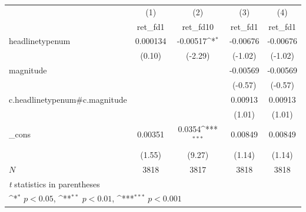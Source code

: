 {
\def\sym#1{\ifmmode^{#1}\else\(^{#1}\)\fi}
\begin{tabular}{l*{4}{c}}
\hline\hline
            &\multicolumn{1}{c}{(1)}&\multicolumn{1}{c}{(2)}&\multicolumn{1}{c}{(3)}&\multicolumn{1}{c}{(4)}\\
            &\multicolumn{1}{c}{ret\_fd1}&\multicolumn{1}{c}{ret\_fd10}&\multicolumn{1}{c}{ret\_fd1}&\multicolumn{1}{c}{ret\_fd1}\\
\hline
headlinetypenum&    0.000134         &    -0.00517\sym{*}  &    -0.00676         &    -0.00676         \\
            &      (0.10)         &     (-2.29)         &     (-1.02)         &     (-1.02)         \\
[1em]
magnitude   &                     &                     &    -0.00569         &    -0.00569         \\
            &                     &                     &     (-0.57)         &     (-0.57)         \\
[1em]
c.headlinetypenum#c.magnitude&                     &                     &     0.00913         &     0.00913         \\
            &                     &                     &      (1.01)         &      (1.01)         \\
[1em]
\_cons      &     0.00351         &      0.0354\sym{***}&     0.00849         &     0.00849         \\
            &      (1.55)         &      (9.27)         &      (1.14)         &      (1.14)         \\
\hline
\(N\)       &        3818         &        3817         &        3818         &        3818         \\
\hline\hline
\multicolumn{5}{l}{\footnotesize \textit{t} statistics in parentheses}\\
\multicolumn{5}{l}{\footnotesize \sym{*} \(p<0.05\), \sym{**} \(p<0.01\), \sym{***} \(p<0.001\)}\\
\end{tabular}
}
